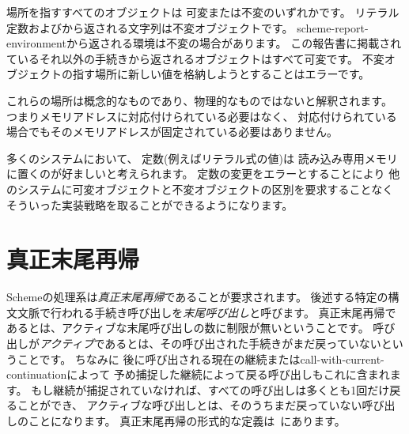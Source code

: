 場所を指すすべてのオブジェクトは
可変または不変のいずれかです。
リテラル定数およびから返される文字列は不変オブジェクトです。
{\cf scheme-\+report-\+environment}から返される環境は不変の場合があります。
この報告書に掲載されているそれ以外の手続きから返されるオブジェクトはすべて可変です。
不変オブジェクトの指す場所に新しい値を格納しようとすることはエラーです。


これらの場所は概念的なものであり、物理的なものではないと解釈されます。
つまりメモリアドレスに対応付けられている必要はなく、
対応付けられている場合でもそのメモリアドレスが固定されている必要はありません。

\begin{rationale}
多くのシステムにおいて、
定数(例えばリテラル式の値)は
読み込み専用メモリに置くのが好ましいと考えられます。
定数の変更をエラーとすることにより
他のシステムに可変オブジェクトと不変オブジェクトの区別を要求することなく
そういった実装戦略を取ることができるようになります。
\end{rationale}

\section{真正末尾再帰}
\label{proper tail recursion}

Schemeの処理系は{\em 真正末尾再帰}であることが要求されます。
後述する特定の構文文脈で行われる手続き呼び出しを{\em 末尾呼び出し}と呼びます。
真正末尾再帰であるとは、アクティブな末尾呼び出しの数に制限が無いということです。
呼び出しが{\em アクティブ}であるとは、その呼び出された手続きがまだ戻っていないということです。
ちなみに
後に呼び出される現在の継続または{\cf call-with-current-continuation}によって
予め捕捉した継続によって戻る呼び出しもこれに含まれます。
もし継続が捕捉されていなければ、すべての呼び出しは多くとも1回だけ戻ることができ、
アクティブな呼び出しとは、そのうちまだ戻っていない呼び出しのことになります。
真正末尾再帰の形式的な定義は\cite{propertailrecursion}~にあります。

